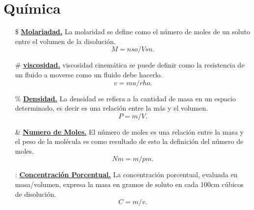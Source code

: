 \documentclass[12pt,letterpaper]{article}
\begin{document}
   \section*{Química}
  \begin{itemize}
      \item[\$] \textbf{\underline{{Molariadad.}}}\newline
     La molaridad se define como el número de moles de un soluto entre el volumen de la disolución.
      $$M = nso / Vsn.$$
      \item[\#] \textbf{\underline{{viscosidad.}}}\newline
      viscosidad cinemática se puede definir como la resistencia de un fluido a moverse como un fluido debe hacerlo.
      $$v={mu}/{rho}.$$
        \item[\%] \textbf{\underline{{Densidad.}}}\newline
        La densidad se refiera a la cantidad de masa en un espacio determinado, es decir es una relación entre la más y el volumen.
        $$P=m/V.$$
        \item[\&] \textbf{\underline{Numero de Moles.}}\newline
        El número de moles es una relación entre la masa y el peso de la molécula es como resultado de esto la definición del número de moles.
        $$Nm=m/pm.$$
        \item[:] \textbf{\underline{{Concentración    Porcentual.}}}\newline
        La concentración porcentual, evaluada en masa/volumen, expresa la masa en gramos de soluto en cada 100cm cúbicos de disolución.  
        $$C=m/v.$$
  \end{itemize}
   \newpage
\end{document}
